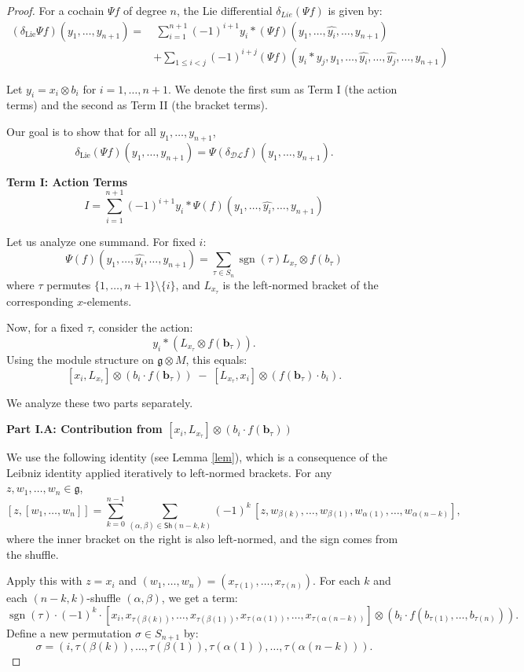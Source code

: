 \documentclass[a4paper, 12pt,oneside,reqno]{amsart}
\newcommand{\DL}{\mathcal{DL}}
\begin{document}
\begin{proof}
For a cochain $\Psi f$ of degree $n$, the Lie differential \(\delta_{Lie}(\Psi f)\) is given by:
\[
\begin{aligned}
(\delta_{\mathrm{Lie}} \Psi f)(y_1, \dots, y_{n+1}) = &\ \sum_{i=1}^{n+1} (-1)^{i+1} y_i \ast (\Psi f)(y_1, \dots, \widehat{y_i}, \dots, y_{n+1}) \\
& +  \sum_{1\leq i < j} (-1)^{i+j} (\Psi f)(y_i\ast y_j, y_1, \ldots, \hat{y_i}, \ldots, \hat{y_j}, \ldots, y_{n+1})
\end{aligned}
\]


Let \(y_i = x_i \otimes b_i\) for \(i = 1, \dots, n+1\). We denote the first sum as Term I (the action terms) and the second as Term II (the bracket terms).

Our goal is to show that for all \(y_1, \dots, y_{n+1}\),
\[
\delta_{\mathrm{Lie}} (\Psi f)(y_1, \dots, y_{n+1}) = \Psi(\delta_{\DL} f)(y_1, \dots, y_{n+1}).
\]

\textbf{Term I: Action Terms}
\[
I = \sum_{i=1}^{n+1} (-1)^{i+1} y_i \ast \Psi(f)(y_1, \dots, \widehat{y_i}, \dots, y_{n+1})
\]

Let us analyze one summand. For fixed \(i\):
\[
\Psi(f)(y_1, \dots, \widehat{y_i}, \dots, y_{n+1}) = \sum_{\tau \in S_n} \operatorname{sgn}(\tau) L_{x_\tau} \otimes f(b_{\tau})
\]
where \(\tau\) permutes \(\{1, \dots, n+1\} \setminus \{i\}\), and \(L_{x_\tau}\) is the left-normed bracket of the corresponding \(x\)-elements.

Now, for a fixed \(\tau\), consider the action:
\[
y_i \ast (L_{x_\tau} \otimes f(\mathbf{b}_\tau)).
\]
Using the module structure on \(\mathfrak{g} \otimes M\), this equals:
\[
[x_i, L_{x_\tau}] \otimes (b_i \cdot f(\mathbf{b}_\tau)) \;-\; [L_{x_\tau}, x_i] \otimes (f(\mathbf{b}_\tau) \cdot b_i). \tag{1}
\]

We analyze these two parts separately.

\textbf{Part I.A: Contribution from \([x_i, L_{x_\tau}] \otimes (b_i \cdot f(\mathbf{b}_\tau))\)}

We use the following identity (see Lemma \ref{lem}), which is a consequence of the Leibniz identity applied iteratively to left-normed brackets. For any \(z, w_1, \dots, w_n \in \mathfrak{g}\),
\[
[z, [w_1, \dots, w_n]] = \sum_{k=0}^{n-1} \sum_{(\alpha, \beta) \in \mathsf{Sh}(n-k, k)} (-1)^k \, [z, w_{\beta(k)}, \dots, w_{\beta(1)}, w_{\alpha(1)}, \dots, w_{\alpha(n-k)}], \tag{2}
\]
where the inner bracket on the right is also left-normed, and the sign comes from the shuffle.

Apply this with \(z = x_i\) and \((w_1, \dots, w_n) = (x_{\tau(1)}, \dots, x_{\tau(n)})\). For each \(k\) and each \((n-k, k)\)-shuffle \((\alpha, \beta)\), we get a term:
\[
\operatorname{sgn}(\tau) \cdot (-1)^k \cdot [x_i, x_{\tau(\beta(k))}, \dots, x_{\tau(\beta(1))}, x_{\tau(\alpha(1))}, \dots, x_{\tau(\alpha(n-k))}] \otimes (b_i \cdot f(b_{\tau(1)}, \dots, b_{\tau(n)})).
\]
Define a new permutation \(\sigma \in S_{n+1}\) by:
\[
\sigma = (i, \tau(\beta(k)), \dots, \tau(\beta(1)), \tau(\alpha(1)), \dots, \tau(\alpha(n-k))).
\]



\end{proof}
\end{document}
